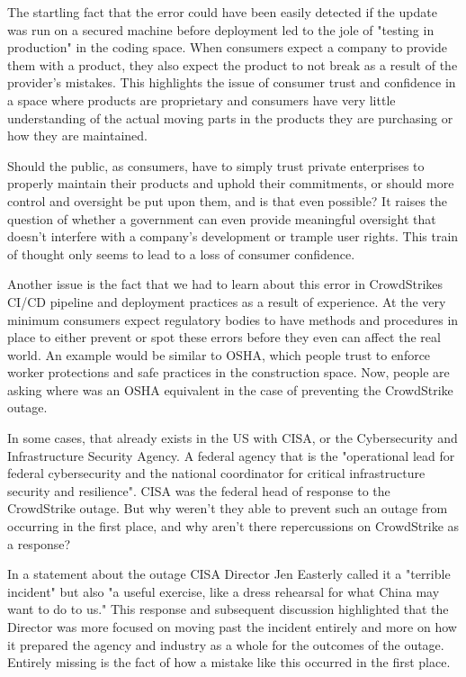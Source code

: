 The startling fact that the error could have been easily detected if the update was run on a secured machine before deployment led to the jole of "testing in production" in the coding space. When consumers expect a company to provide them with a product, they also expect the product to not break as a result of the provider's mistakes. This highlights the issue of consumer trust and confidence in a space where products are proprietary and consumers have very little understanding of the actual moving parts in the products they are purchasing or how they are maintained.

Should the public, as consumers, have to simply trust private enterprises to properly maintain their products and uphold their commitments, or should more control and oversight be put upon them, and is that even possible? It raises the question of whether a government can even provide meaningful oversight that doesn't interfere with a company's development or trample user rights. This train of thought only seems to lead to a loss of consumer confidence.

Another issue is the fact that we had to learn about this error in CrowdStrikes CI/CD pipeline and deployment practices as a result of experience. At the very minimum consumers expect regulatory bodies to have methods and procedures in place to either prevent or spot these errors before they even can affect the real world. An example would be similar to OSHA, which people trust to enforce worker protections and safe practices in the construction space. Now, people are asking where was an OSHA equivalent in the case of preventing the CrowdStrike outage.

In some cases, that already exists in the US with CISA, or the Cybersecurity and Infrastructure Security Agency. A federal agency that is the "operational lead for federal cybersecurity and the national coordinator for critical infrastructure security and resilience". CISA was the federal head of response to the CrowdStrike outage. But why weren't they able to prevent such an outage from occurring in the first place, and why aren't there repercussions on CrowdStrike as a response? 

In a statement about the outage CISA Director Jen Easterly called it a "terrible incident" but also "a useful exercise, like a dress rehearsal for what China may want to do to us." This response and subsequent discussion highlighted that the Director was more focused on moving past the incident entirely and more on how it prepared the agency and industry as a whole for the outcomes of the outage. Entirely missing is the fact of how a mistake like this occurred in the first place. 

